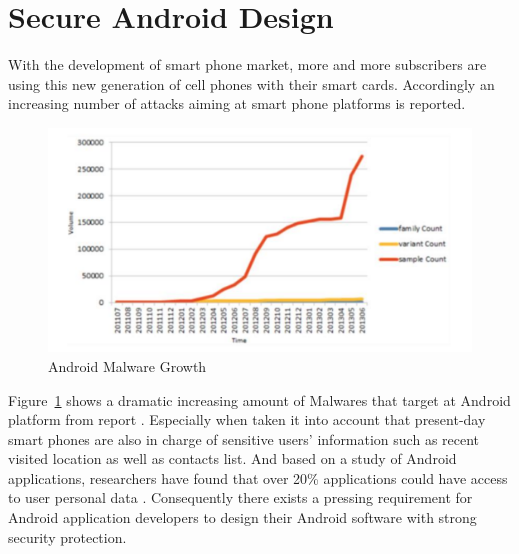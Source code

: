 \section{Secure Android Design}
With the development of smart phone market, more and more subscribers are using this new generation of cell phones with their smart cards. Accordingly an increasing number of attacks aiming at smart phone platforms is reported. 

 \begin{figure}[!htb]
	\centering
	\includegraphics[width=1.0\textwidth]{malware1.pdf}
		\caption{Android Malware Growth \cite{malware}}
	\label{fig:android-malware}
\end{figure}

Figure~\ref{fig:android-malware} shows a dramatic increasing amount of Malwares that target at Android platform from report \cite{malware}. Especially when taken it into account that present-day smart phones are also in charge of sensitive users' information such as recent visited location as well as contacts list.  And based on a study of Android applications, researchers have found that over 20\% applications could have access to user personal data \cite{android_secure_design}. Consequently there exists a pressing requirement for Android application developers to design their Android software with strong security protection. 


